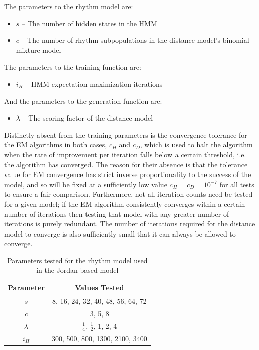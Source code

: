 \documentclass[ author={Stephen Livermore-Tozer},
				supervisor={Dr. Peter Flach},
				degree={MEng},
				title={Algorithmic Co-composition Using Machine Learning},
				subtitle={},
				type={research},
				year={2016} ]{dissertation}
\begin{document}
	The parameters to the rhythm model are:
	\begin{itemize}
		\item $s$ -- The number of hidden states in the HMM
		\item $c$ -- The number of rhythm subpopulations in the distance model's binomial mixture model
	\end{itemize}
	The parameters to the training function are:
	\begin{itemize}
		\item $i_H$ -- HMM expectation-maximization iterations
	\end{itemize}
	And the parameters to the generation function are:
	\begin{itemize}
		\item $\lambda$ -- The scoring factor of the distance model
	\end{itemize}
	
	Distinctly absent from the training parameters is the convergence tolerance for the EM algorithms in both cases, $c_H$ and $c_D$, which is used to halt the algorithm when the rate of improvement per iteration falls below a certain threshold, i.e. the algorithm has converged. The reason for their absence is that the tolerance value for EM convergence has strict inverse proportionality to the success of the model, and so will be fixed at a sufficiently low value $c_H = c_D = 10^{-7}$ for all tests to ensure a fair comparison. Furthermore, not all iteration counts need be tested for a given model; if the EM algorithm consistently converges within a certain number of iterations then testing that model with any greater number of iterations is purely redundant. The number of iterations required for the distance model to converge is also sufficiently small that it can always be allowed to converge. 
	
	\begin{table}[h]
		\begin{center}
			\begin{tabular}{cc}
				\toprule
				Parameter & Values Tested\\
				\hline
				$s$ & 8, 16, 24, 32, 40, 48, 56, 64, 72\\
				$c$ & 3, 5, 8\\
				$\lambda$ & $\frac{1}{4}$, $\frac{1}{2}$, 1, 2, 4\\
				$i_H$ & 300, 500, 800, 1300, 2100, 3400\\
				\bottomrule
			\end{tabular}
		\end{center}
		\caption{Parameters tested for the rhythm model used in the Jordan-based model}
		\label{tab:jordan-rhythm-parameters}
	\end{table}
	
\end{document}
